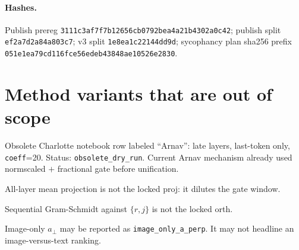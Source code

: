 \documentclass{article}
\begin{document}
\paragraph{Hashes.}
Publish prereg \texttt{3111c3af7f7b12656cb0792bea4a21b4302a0c42}; publish split \texttt{ef2a7d2a84a803c7}; v3 split \texttt{1e8ea1c22144dd9d}; sycophancy plan sha256 prefix \texttt{051e1ea79cd116fce56edeb43848ae10526e2830}.

\section{Method variants that are out of scope}

Obsolete Charlotte notebook row labeled ``Arnav'': late layers, last-token only, \texttt{coeff}=20. Status: \texttt{obsolete\_dry\_run}. Current Arnav mechanism already used normscaled $+$ fractional gate before unification.

All-layer mean projection is not the locked proj: it dilutes the gate window.

Sequential Gram-Schmidt against $\{r,j\}$ is not the locked orth.

Image-only $a_\perp$ may be reported as \texttt{image\_only\_a\_perp}. It may not headline an image-versus-text ranking.

\newpage

\end{document}
